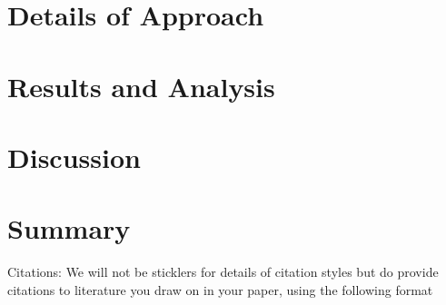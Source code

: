\documentclass[12pt]{article}
\begin{document}

\section{Details of Approach}



\section{Results and Analysis}





\section{Discussion}





\section{Summary}

Citations:   We will not be sticklers for details of citation styles but do provide citations to literature you draw on in your paper, using the following format
\end{document}
